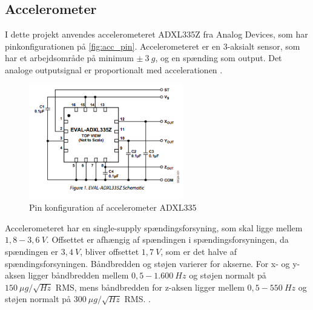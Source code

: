 \subsection{Accelerometer} \label{sec:acc}

I dette projekt anvendes accelerometeret ADXL335Z fra Analog Devices, som har pinkonfigurationen på \autoref{fig:acc_pin}. Accelerometeret er en 3-aksialt sensor, som har et arbejdsområde på minimum $\pm~3~g$, og en spænding som output. Det analoge outputsignal er proportionalt med accelerationen \citep{analogdevices2009}. 


\begin{figure}[H]
\centering
\includegraphics[width=0.6\textwidth]{figures/acc_pin.png}
\caption{Pin konfiguration af accelerometer ADXL335 \citep{analogdevices2009}}
\label{fig:acc_pin}
\end{figure}

\noindent
Accelerometeret har en single-supply spændingsforsyning, som skal ligge mellem $1,8 - 3,6~V$.  Offsettet er afhængig af spændingen i spændingsforsyningen, da spændingen er $3,4~V$, bliver offsettet $1,7~V$, som er det halve af spændingsforsyningen. Båndbredden og støjen varierer for akserne. For x- og y-aksen ligger båndbredden mellem $0,5 - 1.600~Hz$ og støjen normalt på $150~\mu g/\sqrt{Hz}$ RMS, mens båndbredden for z-aksen ligger mellem $0,5 - 550~Hz$ og støjen normalt på $300~\mu g/\sqrt{Hz}$ RMS.  \citep{analogdevices2010}. 

